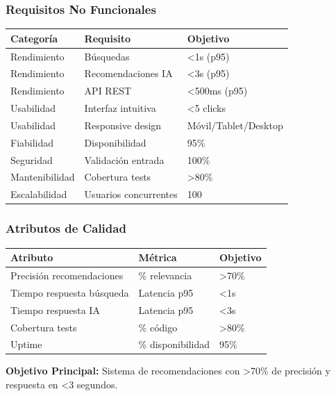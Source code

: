 \documentclass[aspectratio=169]{beamer}
\begin{document}
\begin{frame}
\frametitle{Requisitos No Funcionales}

\begin{table}
\centering
\small
\begin{tabular}{p{3cm}p{6cm}p{2cm}}
\toprule
\textbf{Categoría} & \textbf{Requisito} & \textbf{Objetivo} \\
\midrule
Rendimiento & Búsquedas & <1s (p95) \\
Rendimiento & Recomendaciones IA & <3s (p95) \\
Rendimiento & API REST & <500ms (p95) \\
Usabilidad & Interfaz intuitiva & <5 clicks \\
Usabilidad & Responsive design & Móvil/Tablet/Desktop \\
Fiabilidad & Disponibilidad & 95\% \\
Seguridad & Validación entrada & 100\% \\
Mantenibilidad & Cobertura tests & >80\% \\
Escalabilidad & Usuarios concurrentes & 100 \\
\bottomrule
\end{tabular}
\end{table}

\end{frame}

\begin{frame}
\frametitle{Atributos de Calidad}

\begin{table}
\centering
\begin{tabular}{p{4cm}p{3cm}p{2cm}}
\toprule
\textbf{Atributo} & \textbf{Métrica} & \textbf{Objetivo} \\
\midrule
Precisión recomendaciones & \% relevancia & >70\% \\
Tiempo respuesta búsqueda & Latencia p95 & <1s \\
Tiempo respuesta IA & Latencia p95 & <3s \\
Cobertura tests & \% código & >80\% \\
Uptime & \% disponibilidad & 95\% \\
\bottomrule
\end{tabular}
\end{table}

\vspace{0.3cm}

\begin{tcolorbox}[colback=yellow!5, colframe=yellow!50]
\textbf{Objetivo Principal:} Sistema de recomendaciones con >70\% de precisión y respuesta en <3 segundos.
\end{tcolorbox}

\end{frame}
\end{document}
